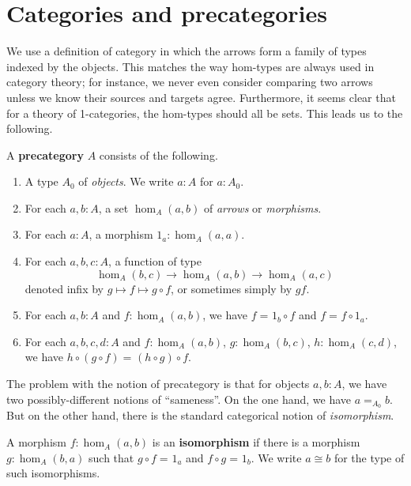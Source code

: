 \documentclass{amsart}
\newcommand{\id}[3][]{\ensuremath{#2 =_{#1} #3}\xspace}
\theoremstyle{definition}
\theoremstyle{remark}
\numberwithin{equation}{section}
\begin{document}
\section{Categories and precategories}
\label{sec:cats}

We use a definition of category in which the arrows form a family of types indexed by the objects.
This matches the way hom-types are always used in category theory; for instance, we never even consider comparing two arrows unless we know their sources and targets agree.
Furthermore, it seems clear that for a theory of 1-categories, the hom-types should all be sets.
This leads us to the following.

\begin{defn}\label{ct:precategory}
  A \textbf{precategory} $A$ consists of the following.
  \begin{enumerate}
  \item A type $A_0$ of \emph{objects}.  We write $a:A$ for $a:A_0$.
  \item For each $a,b:A$, a set $\hom_A(a,b)$ of \emph{arrows} or \emph{morphisms}.
  \item For each $a:A$, a morphism $1_a:\hom_A(a,a)$.
  \item For each $a,b,c:A$, a function of type
    \[  \hom_A(b,c) \to \hom_A(a,b) \to \hom_A(a,c) \]
    denoted infix by $g\mapsto f\mapsto g\circ f$, or sometimes simply by $gf$.
  \item For each $a,b:A$ and $f:\hom_A(a,b)$, we have $\id f {1_b\circ f}$ and $\id f {f\circ 1_a}$.
  \item For each $a,b,c,d:A$ and $f:\hom_A(a,b)$, $g:\hom_A(b,c)$, $h:\hom_A(c,d)$, we have $\id {h\circ (g\circ f)}{(h\circ g)\circ f}$.
  \end{enumerate}
\end{defn}

The problem with the notion of precategory is that for objects $a,b:A$, we have two possibly-different notions of ``sameness''.
On the one hand, we have $\id[A_0]{a}{b}$.
But on the other hand, there is the standard categorical notion of \emph{isomorphism}.

\begin{defn}\label{ct:isomorphism}
  A morphism $f:\hom_A(a,b)$ is an \textbf{isomorphism} if there is a morphism $g:\hom_A(b,a)$ such that $\id{g\circ f}{1_a}$ and $\id{f\circ g}{1_b}$.
  We write $a\cong b$ for the type of such isomorphisms.
\end{defn}
\end{document}
